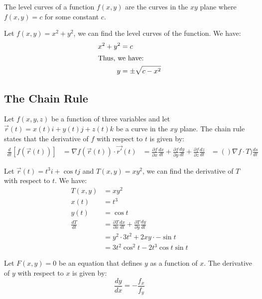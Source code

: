 \documentclass[11pt]{report}
\begin{document}
\begin{definition}
    The level curves of a function $f(x, y)$ are the curves in the $xy$ plane where $f(x, y) = c$ for some constant $c$.
\end{definition}
\begin{example}
    Let $f(x, y) = x^2 + y^2$, we can find the level curves of the function. We have:
    \begin{align*}
        x^2 + y^2 &= c \\
        \intertext{Thus, we have:}
        y &= \pm \sqrt{c - x^2}
    \end{align*}
\end{example}
\subsection{The Chain Rule}
\begin{theorem}
    Let $f(x, y, z)$ be a function of three variables and let $\vec{r}(t) = x(t)i + y(t)j + z(t)k$ be a curve in the $xy$ plane. The chain rule states that the derivative of $f$ with respect to $t$ is given by:
    \begin{align}
        \frac{d}{dt}[f(\vec{r}(t))] &= \nabla f (\vec{r}(t)) \cdot \vec{r'}(t)
        &= \frac{\partial f}{\partial x} \frac{dx}{dt} + \frac{\partial f}{\partial y} \frac{dy}{dt} + \frac{\partial f}{\partial z} \frac{dz}{dt} 
        &= ()\nabla f \cdot T)\frac{ds}{dt}
    \end{align}
\end{theorem}
\begin{example}
    Let $\vec{r}(t) = t^3 i + \cos t j$ and $T(x, y) = xy^2$, we can find the derivative of $T$ with respect to $t$. We have:
    \begin{align*}
        T(x, y) &= xy^2 \\
        x(t) &= t^3 \\
        y(t) &= \cos t \\
        \frac{dT}{dt} &= \frac{\partial T}{\partial x} \frac{dx}{dt} + \frac{\partial T}{\partial y} \frac{dy}{dt} \\
        &= y^2 \cdot 3t^2 + 2xy \cdot -\sin t \\
        &= 3t^2\cos^2 t - 2t^3\cos t \sin t
    \end{align*}
\end{example}
\begin{theorem}
    Let $F(x, y) = 0$ be an equation that defines $y$ as a function of $x$. The derivative of $y$ with respect to $x$ is given by:
    \begin{equation}
        \frac{dy}{dx} = -\frac{f_x}{f_y}
    \end{equation}
\end{theorem}
\end{document}
